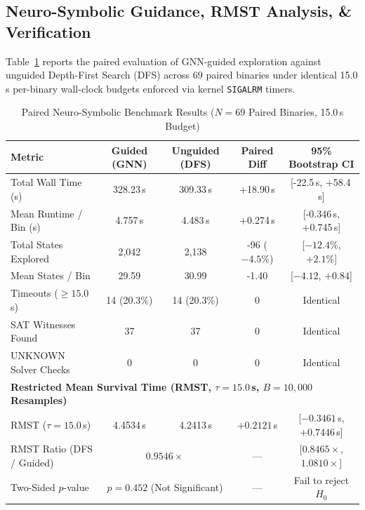 \documentclass[10pt,conference]{IEEEtran}
\begin{document}
\subsection{Neuro-Symbolic Guidance, RMST Analysis, & Verification}
Table~\ref{tab:symexec} reports the paired evaluation of GNN-guided exploration against unguided Depth-First Search (DFS)
across 69 paired binaries under identical 15.0\,s per-binary wall-clock budgets enforced via kernel \texttt{SIGALRM} timers.

\begin{table}[!t]
\caption{Paired Neuro-Symbolic Benchmark Results ($N = 69$ Paired Binaries, 15.0\,s Budget)}
\label{tab:symexec}
\renewcommand{\arraystretch}{1.0}
\footnotesize
\setlength\tabcolsep{2.2pt}
\begin{tabular}{lcccc}
\toprule
\textbf{Metric} & \textbf{Guided (GNN)} & \textbf{Unguided (DFS)} & \textbf{Paired Diff} & \textbf{95\% Bootstrap CI} \\
\midrule
Total Wall Time (s)     & 328.23\,s & 309.33\,s & +18.90\,s & [-22.5\,s, +58.4\,s] \\
Mean Runtime / Bin (s)  & 4.757\,s  & 4.483\,s  & +0.274\,s & [-0.346\,s, +0.745\,s] \\
Total States Explored   & 2{,}042   & 2{,}138   & -96 ($-4.5\%$) & [$-12.4\%$, $+2.1\%$] \\
Mean States / Bin       & 29.59     & 30.99     & -1.40     & [$-4.12$, $+0.84$] \\
Timeouts ($\geq 15.0$\,s)& 14 (20.3\%) & 14 (20.3\%) & 0        & Identical \\
SAT Witnesses Found     & 37        & 37        & 0         & Identical \\
UNKNOWN Solver Checks   & 0         & 0         & 0         & Identical \\
\midrule
\multicolumn{5}{l}{\textbf{Restricted Mean Survival Time (RMST, $\tau = 15.0$\,s, $B=10{,}000$ Resamples)}} \\
RMST ($\tau = 15.0$\,s) & 4.4534\,s & 4.2413\,s & $+0.2121$\,s & [$-0.3461$\,s, $+0.7446$\,s] \\
RMST Ratio (DFS / Guided)& \multicolumn{2}{c}{$0.9546\times$} & --- & [$0.8465\times$, $1.0810\times$] \\
Two-Sided $p$-value     & \multicolumn{2}{c}{$p = 0.452$ (Not Significant)} & --- & Fail to reject $H_0$ \\
\bottomrule
\end{tabular}
\end{table}
\end{document}
